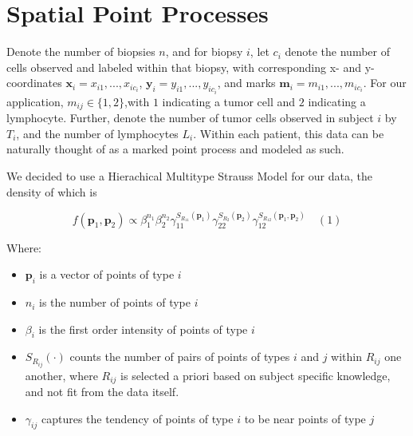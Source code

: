 \documentclass[
]{book}
\providecommand{\tightlist}{%
  \setlength{\itemsep}{0pt}\setlength{\parskip}{0pt}}
\begin{document}
\hypertarget{spatial-point-processes}{%
\section{Spatial Point Processes}\label{spatial-point-processes}}

Denote the number of biopsies \(n\), and for biopsy \(i\), let \(c_i\) denote
the number of cells observed and labeled within that biopsy, with
corresponding x- and y- coordinates
\(\mathbf{x}_i = x_{i1},...,x_{ic_i}\),
\(\mathbf{y}_i = y_{i1},...,y_{ic_i}\), and marks
\(\mathbf{m}_i = m_{i1},...,m_{ic_i}\). For our application,
\(m_{ij} \in \{1, 2\}\),with \(1\) indicating a tumor cell and \(2\)
indicating a lymphocyte. Further, denote the number of tumor cells
observed in subject \(i\) by \(T_i\), and the number of lymphocytes \(L_i\).
Within each patient, this data can be naturally thought of as a marked
point process and modeled as such.

We decided to use a Hierachical Multitype Strauss Model for our data,
the density of which is

\[ f(\mathbf{p}_1, \mathbf{p}_2) \propto 
\beta_1^{n_1} \beta_2^{n_2}
\gamma_{11}^{S_{R_{11}}(\mathbf{p}_1)}
\gamma_{22}^{S_{R_{2}}(\mathbf{p}_2)}
\gamma_{12}^{S_{R_{12}}(\mathbf{p}_1, \mathbf{p}_2)}
\quad (1)\]

Where:

\begin{itemize}
\tightlist
\item
  \(\mathbf{p}_i\) is a vector of points of type \(i\)
\item
  \(n_i\) is the number of points of type \(i\)
\item
  \(\beta_i\) is the first order intensity of points of type \(i\)
\item
  \(S_{R_{ij}}(\cdot)\) counts the number of pairs of points of types
  \(i\) and \(j\) within \(R_{ij}\) one another, where \(R_{ij}\) is selected
  a priori based on subject specific knowledge, and not fit from the
  data itself.
\item
  \(\gamma_{ij}\) captures the tendency of points of type \(i\) to be near
  points of type \(j\)
\end{itemize}
\end{document}
